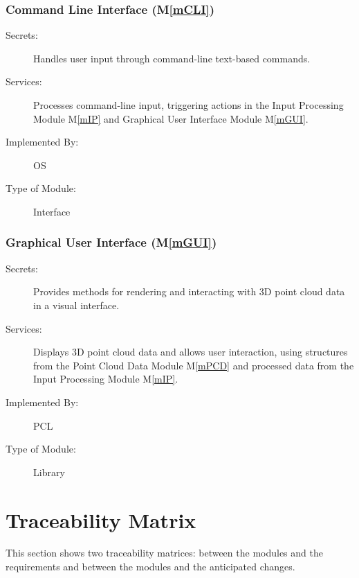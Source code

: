 \documentclass[12pt, titlepage]{article}
\newcommand{\mref}[1]{M\ref{#1}}
\begin{document}
\subsubsection{Command Line Interface (\mref{mCLI})}

\begin{description}
\item[Secrets:] Handles user input through command-line text-based commands.
\item[Services:] Processes command-line input, triggering actions in the Input Processing Module \mref{mIP}
  and Graphical User Interface Module \mref{mGUI}.
\item[Implemented By:] OS
\item[Type of Module:] Interface
\end{description}

\subsubsection{Graphical User Interface (\mref{mGUI})}

\begin{description}
\item[Secrets:] Provides methods for rendering and interacting with 3D point cloud data in a visual interface.
\item[Services:] Displays 3D point cloud data and allows user interaction, using structures from the Point Cloud Data Module \mref{mPCD} 
  and processed data from the Input Processing Module \mref{mIP}.
\item[Implemented By:] PCL
\item[Type of Module:] Library
\end{description}

\section{Traceability Matrix} \label{SecTM}

This section shows two traceability matrices: between the modules and the
requirements and between the modules and the anticipated changes.
\end{document}
